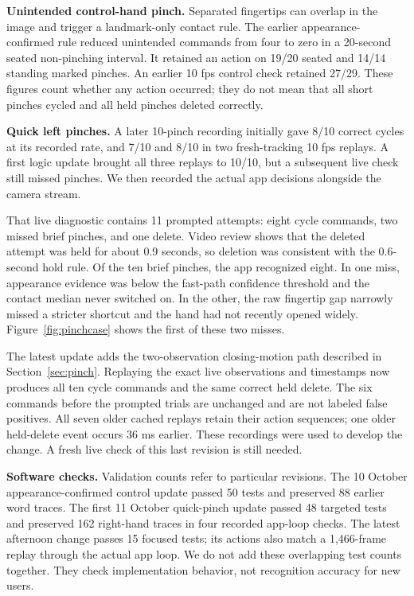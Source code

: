 \textbf{Unintended control-hand pinch.} Separated fingertips can overlap in the image and trigger a landmark-only contact rule. The earlier appearance-confirmed rule reduced unintended commands from four to zero in a 20-second seated non-pinching interval. It retained an action on 19/20 seated and 14/14 standing marked pinches. An earlier 10 fps control check retained 27/29. These figures count whether any action occurred; they do not mean that all short pinches cycled and all held pinches deleted correctly.

\textbf{Quick left pinches.} A later 10-pinch recording initially gave 8/10 correct cycles at its recorded rate, and 7/10 and 8/10 in two fresh-tracking 10 fps replays. A first logic update brought all three replays to 10/10, but a subsequent live check still missed pinches. We then recorded the actual app decisions alongside the camera stream.

That live diagnostic contains 11 prompted attempts: eight cycle commands, two missed brief pinches, and one delete. Video review shows that the deleted attempt was held for about 0.9 seconds, so deletion was consistent with the 0.6-second hold rule. Of the ten brief pinches, the app recognized eight. In one miss, appearance evidence was below the fast-path confidence threshold and the contact median never switched on. In the other, the raw fingertip gap narrowly missed a stricter shortcut and the hand had not recently opened widely. Figure~\ref{fig:pinchcase} shows the first of these two misses.

The latest update adds the two-observation closing-motion path described in Section~\ref{sec:pinch}. Replaying the exact live observations and timestamps now produces all ten cycle commands and the same correct held delete. The six commands before the prompted trials are unchanged and are not labeled false positives. All seven older cached replays retain their action sequences; one older held-delete event occurs 36 ms earlier. These recordings were used to develop the change. A fresh live check of this last revision is still needed.



\textbf{Software checks.} Validation counts refer to particular revisions. The 10 October appearance-confirmed control update passed 50 tests and preserved 88 earlier word traces. The first 11 October quick-pinch update passed 48 targeted tests and preserved 162 right-hand traces in four recorded app-loop checks. The latest afternoon change passes 15 focused tests; its actions also match a 1,466-frame replay through the actual app loop. We do not add these overlapping test counts together. They check implementation behavior, not recognition accuracy for new users.

